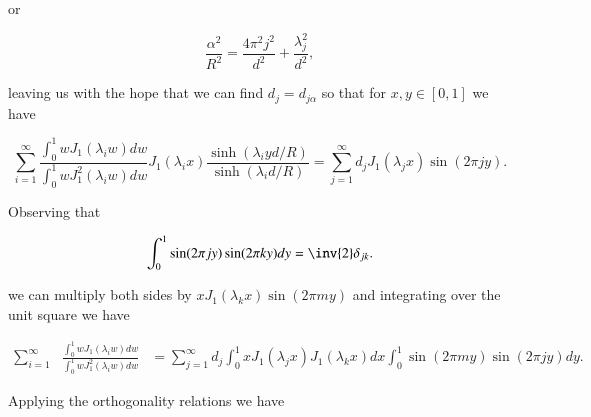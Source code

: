 or

\begin{equation}\label{eqn:coffeeCupWithBottom:880}
\frac{\alpha^2}{R^2} = \frac{4 \pi^2 j^2}{d^2} + \frac{\lambda_j^2}{d^2},
\end{equation}

leaving us with the hope that we can find $d_j = d_{j\alpha}$ so that for $x,y \in [0,1]$ we have

\begin{equation}\label{eqn:coffeeCupWithBottom:900}
\sum_{i=1}^\infty 
\frac{
\int_0^1 w J_1 (\lambda_i w) dw
}{
\int_0^1 w J_1^2 (\lambda_i w) dw
}
J_1(\lambda_i x) \frac{\sinh(\lambda_i y d/R)}{\sinh(\lambda_i d/R) } 
=
\sum_{j = 1}^\infty d_j J_1(\lambda_j x) \sin\left( 2 \pi j y \right).
\end{equation}

Observing that 

\begin{equation}\label{eqn:coffeeCupWithBottom:920}
\int_0^1 \sin(2 \pi j y) \sin(2 \pi k y) dy = \inv{2} \delta_{j k}.
\end{equation}

we can multiply both sides by $x J_1(\lambda_k x) \sin ( 2 \pi m y )$ and integrating over the unit square we have

\begin{equation}\label{eqn:coffeeCupWithBottom:940}
\begin{aligned}
\sum_{i=1}^\infty 
&\frac{
\int_0^1 w J_1 (\lambda_i w) dw
}{
\int_0^1 w J_1^2 (\lambda_i w) dw
}
&=
\sum_{j = 1}^\infty d_j \int_0^1 x J_1(\lambda_j x) J_1( \lambda_k x) dx \int_0^1 \sin( 2 \pi m y ) \sin\left( 2 \pi j y \right) dy.
\end{aligned}
\end{equation}

Applying the orthogonality relations we have

